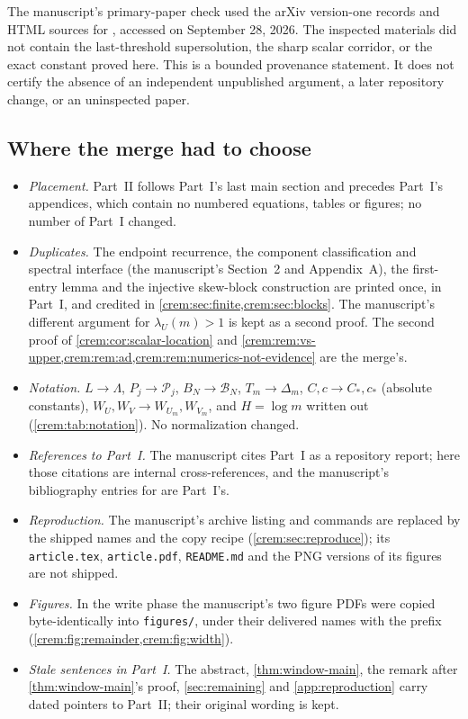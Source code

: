 \documentclass[11pt,a4paper]{article}
\theoremstyle{definition}\newaliascnt{definition}{theorem}
\theoremstyle{remark}\newaliascnt{remark}{theorem}
\newcommand{\Bformal}{\mathcal B}%
\begin{document}
The manuscript's primary-paper check used the arXiv version-one records and
HTML sources for \cite{Nadler,MayamaAkita}, accessed on September 28, 2026.
The inspected materials did not contain the last-threshold supersolution,
the sharp scalar corridor, or the exact constant proved here. This is a
bounded provenance statement. It does not certify the absence of an
independent unpublished argument, a later repository change, or an
uninspected paper.

\subsection{Where the merge had to choose}
\label{crem:sec:merge}
\begin{itemize}
\item \emph{Placement.} Part~II follows Part~I's last main section and
 precedes Part~I's appendices, which contain no numbered equations, tables or
 figures; no number of Part~I changed.
\item \emph{Duplicates.} The endpoint recurrence, the component
 classification and spectral interface (the manuscript's Section~2 and
 Appendix~A), the first-entry lemma and the injective skew-block
 construction are printed once, in Part~I, and credited in
 \cref{crem:sec:finite,crem:sec:blocks}. The manuscript's different argument
 for $\lambda_U(m)>1$ is kept as a second proof. The second proof of
 \cref{crem:cor:scalar-location} and \cref{crem:rem:vs-upper,crem:rem:ad,crem:rem:numerics-not-evidence}
 are the merge's.
\item \emph{Notation.} $L\to\Lambda$, $P_j\to\mathcal P_j$,
 $B_N\to\Bformal_N$, $T_m\to\Delta_m$, $C,c\to C_\ast,c_\ast$ (absolute
 constants), $W_U,W_V\to W_{U_m},W_{V_m}$, and $H=\log m$ written out
 (\cref{crem:tab:notation}). No normalization changed.
\item \emph{References to Part~I.} The manuscript cites Part~I as a
 repository report; here those citations are internal cross-references, and
 the manuscript's bibliography entries for \cite{Nadler,MayamaAkita} are
 Part~I's.
\item \emph{Reproduction.} The manuscript's archive listing and commands are
 replaced by the shipped names and the copy recipe
 (\cref{crem:sec:reproduce}); its \texttt{article.tex}, \texttt{article.pdf},
 \texttt{README.md} and the PNG versions of its figures are not shipped.
\item \emph{Figures.} In the write phase the manuscript's two figure PDFs
 were copied byte-identically into \texttt{figures/}, under their delivered
 names with the prefix 
 (\cref{crem:fig:remainder,crem:fig:width}).
\item \emph{Stale sentences in Part~I.} The abstract, \cref{thm:window-main},
 the remark after \cref{thm:window-main}'s proof, \cref{sec:remaining} and
 \cref{app:reproduction} carry dated pointers to Part~II; their original
 wording is kept.
\end{itemize}
\end{document}

